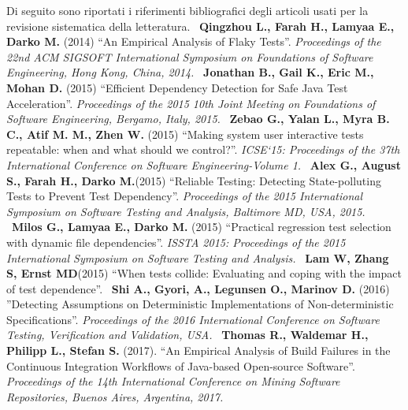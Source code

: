 \fancyhead[C]{}
Di seguito sono riportati i riferimenti bibliografici degli articoli usati per la
revisione sistematica della letteratura.
\newline~\newline
[S1] \textbf{Qingzhou L., Farah H., Lamyaa E., Darko M.} (2014) “An Empirical Analysis of Flaky Tests”. \emph{Proceedings of the 22nd ACM SIGSOFT International Symposium on Foundations of Software Engineering, Hong Kong, China, 2014.}
\newline~\newline
[S2] \textbf{Jonathan B., Gail K., Eric M., Mohan D.} (2015) “Efficient Dependency Detection for Safe Java Test Acceleration”. \emph{Proceedings of the 2015 10th Joint Meeting on Foundations of Software Engineering, Bergamo, Italy, 2015.}
\newline~\newline
[S3] \textbf{Zebao G., Yalan L., Myra B. C., Atif M. M., Zhen W.} (2015) “Making system user interactive tests repeatable: when and what should we control?”. \emph{ICSE‘15: Proceedings of the 37th International Conference on Software Engineering-Volume 1.}
\newline~\newline
[S4] \textbf{Alex G., August S., Farah H., Darko M.}(2015) “Reliable Testing: Detecting State-polluting Tests to Prevent Test Dependency”. \emph{Proceedings of the 2015 International Symposium on Software Testing and Analysis, Baltimore MD, USA, 2015.}
\newline~\newline
[S5] \textbf{Milos G., Lamyaa E., Darko M.} (2015) 
“Practical regression test selection with dynamic file dependencies”. \emph{ISSTA 2015: Proceedings of the 2015
International Symposium on Software Testing and Analysis.}
\newline~\newline
[S6] \textbf{Lam W, Zhang S, Ernst MD}(2015) “When tests collide: Evaluating and coping with the impact of test dependence”.
\newline~\newline
[S7] \textbf{Shi A., Gyori, A., Legunsen O., Marinov D.} (2016) ”Detecting Assumptions on Deterministic Implementations of Non-deterministic Specifications”.\emph{ Proceedings of the 2016 International Conference on Software Testing, Verification and Validation, USA.}
\newline~\newline
[S8] \textbf{Thomas R., Waldemar H., Philipp L., Stefan S.} (2017). “An Empirical Analysis of Build Failures in the Continuous Integration Workflows of Java-based Open-source Software”. \emph{Proceedings of the 14th International Conference on Mining Software Repositories, Buenos Aires, Argentina, 2017.}
